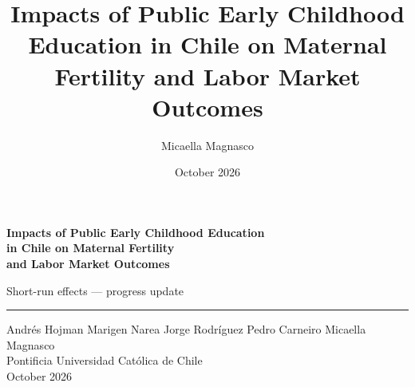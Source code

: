 \documentclass[aspectratio=169,10pt]{beamer}
\title{Impacts of Public Early Childhood Education in Chile on Maternal Fertility and Labor Market Outcomes}
\author{Micaella Magnasco}
\date{October 2026}
\begin{document}
\begin{frame}[plain]
\vspace{40pt}
\begin{center}
{\LARGE\bfseries\color{navy} Impacts of Public Early Childhood Education\\[3pt] in Chile on Maternal Fertility\\[3pt] and Labor Market Outcomes}

\vspace{8pt}
{\large\color{graytext} Short-run effects --- progress update}

\vspace{10pt}
\textcolor{steel}{\rule{0.5\paperwidth}{0.6pt}}

\vspace{18pt}
{\normalsize
Andr\'es Hojman \quad Marigen Narea \quad Jorge Rodr\'iguez \quad Pedro Carneiro \quad Micaella Magnasco\\[8pt]
\small Pontificia Universidad Cat\'olica de Chile \\[2pt]
\small October 2026
}
\end{center}
\end{frame}
\end{document}
